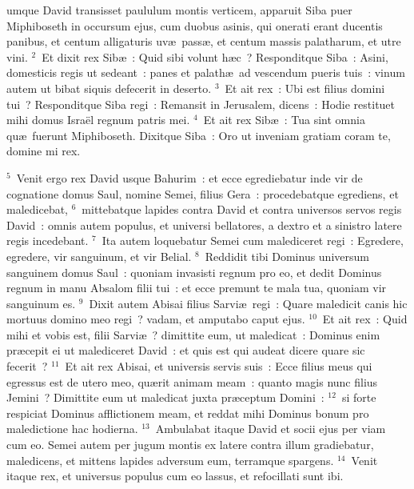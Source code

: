 \bchapter
{}umque David transisset paululum montis verticem, apparuit Siba puer Miphiboseth in occursum ejus, cum duobus asinis, qui onerati erant ducentis panibus, et centum alligaturis uv\ae\ pass\ae , et centum massis palatharum, et utre vini.
${}^{2}$~Et dixit rex Sib\ae~: Quid sibi volunt h\ae c~? Responditque Siba~: Asini, domesticis regis ut sedeant~: panes et palath\ae\ ad vescendum pueris tuis~: vinum autem ut bibat siquis defecerit in deserto.
${}^{3}$~Et ait rex~: Ubi est filius domini tui~? Responditque Siba regi~: Remansit in Jerusalem, dicens~: Hodie restituet mihi domus Isra\"el regnum patris mei.
${}^{4}$~Et ait rex Sib\ae~: Tua sint omnia qu\ae\ fuerunt Miphiboseth. Dixitque Siba~: Oro ut inveniam gratiam coram te, domine mi rex.


${}^{5}$~Venit ergo rex David usque Bahurim~: et ecce egrediebatur inde vir de cognatione domus Saul, nomine Semei, filius Gera~: procedebatque egrediens, et maledicebat,
${}^{6}$~mittebatque lapides contra David et contra universos servos regis David~: omnis autem populus, et universi bellatores, a dextro et a sinistro latere regis incedebant.
${}^{7}$~Ita autem loquebatur Semei cum malediceret regi~: Egredere, egredere, vir sanguinum, et vir Belial.
${}^{8}$~Reddidit tibi Dominus universum sanguinem domus Saul~: quoniam invasisti regnum pro eo, et dedit Dominus regnum in manu Absalom filii tui~: et ecce premunt te mala tua, quoniam vir sanguinum es.
${}^{9}$~Dixit autem Abisai filius Sarvi\ae\ regi~: Quare maledicit canis hic mortuus domino meo regi~? vadam, et amputabo caput ejus.
${}^{10}$~Et ait rex~: Quid mihi et vobis est, filii Sarvi\ae~? dimittite eum, ut maledicat~: Dominus enim pr\ae cepit ei ut malediceret David~: et quis est qui audeat dicere quare sic fecerit~?
${}^{11}$~Et ait rex Abisai, et universis servis suis~: Ecce filius meus qui egressus est de utero meo, qu\ae rit animam meam~: quanto magis nunc filius Jemini~? Dimittite eum ut maledicat juxta pr\ae ceptum Domini~:
${}^{12}$~si forte respiciat Dominus afflictionem meam, et reddat mihi Dominus bonum pro maledictione hac hodierna.
${}^{13}$~Ambulabat itaque David et socii ejus per viam cum eo. Semei autem per jugum montis ex latere contra illum gradiebatur, maledicens, et mittens lapides adversum eum, terramque spargens.
${}^{14}$~Venit itaque rex, et universus populus cum eo lassus, et refocillati sunt ibi.


